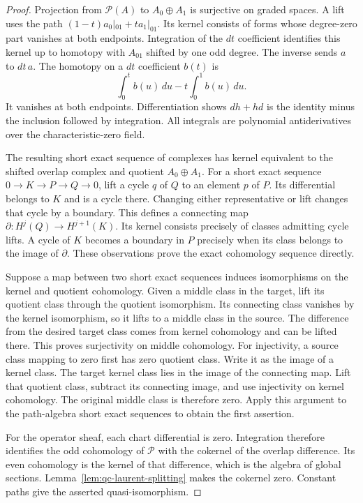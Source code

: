 \begin{proof}
Projection from $\mathcal P(A)$ to $A_0\oplus A_1$ is surjective on graded spaces.
A lift uses the path $(1-t)a_0|_{01}+t a_1|_{01}$.
Its kernel consists of forms whose degree-zero part vanishes at both endpoints.
Integration of the $dt$ coefficient identifies this kernel up to homotopy with $A_{01}$ shifted by one odd degree.
The inverse sends $a$ to $dt\,a$.
The homotopy on a $dt$ coefficient $b(t)$ is
\[
 \int_0^t b(u)\,du-t\int_0^1 b(u)\,du.
\]
It vanishes at both endpoints.
Differentiation shows $dh+hd$ is the identity minus the inclusion followed by integration.
All integrals are polynomial antiderivatives over the characteristic-zero field.

The resulting short exact sequence of complexes has kernel equivalent to the shifted overlap complex and quotient $A_0\oplus A_1$.
For a short exact sequence $0\to K\to P\to Q\to0$, lift a cycle $q$ of $Q$ to an element $p$ of $P$.
Its differential belongs to $K$ and is a cycle there.
Changing either representative or lift changes that cycle by a boundary.
This defines a connecting map $\partial:H^j(Q)\to H^{j+1}(K)$.
Its kernel consists precisely of classes admitting cycle lifts.
A cycle of $K$ becomes a boundary in $P$ precisely when its class belongs to the image of $\partial$.
These observations prove the exact cohomology sequence directly.

Suppose a map between two short exact sequences induces isomorphisms on the kernel and quotient cohomology.
Given a middle class in the target, lift its quotient class through the quotient isomorphism.
Its connecting class vanishes by the kernel isomorphism, so it lifts to a middle class in the source.
The difference from the desired target class comes from kernel cohomology and can be lifted there.
This proves surjectivity on middle cohomology.
For injectivity, a source class mapping to zero first has zero quotient class.
Write it as the image of a kernel class.
The target kernel class lies in the image of the connecting map.
Lift that quotient class, subtract its connecting image, and use injectivity on kernel cohomology.
The original middle class is therefore zero.
Apply this argument to the path-algebra short exact sequences to obtain the first assertion.

For the operator sheaf, each chart differential is zero.
Integration therefore identifies the odd cohomology of $\mathcal P$ with the cokernel of the overlap difference.
Its even cohomology is the kernel of that difference, which is the algebra of global sections.
Lemma~\ref{lem:qc-laurent-splitting} makes the cokernel zero.
Constant paths give the asserted quasi-isomorphism.
\end{proof}


